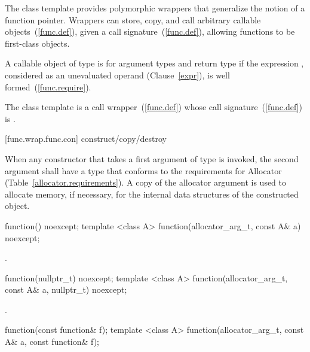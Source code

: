 \pnum
The  class template provides polymorphic wrappers that
generalize the notion of a function pointer. Wrappers can store, copy,
and call arbitrary callable objects~(\ref{func.def}), given a call
signature~(\ref{func.def}), allowing functions to be first-class objects.

\pnum
{}%
A callable object  of type 
is  for argument
types 
and return type 
if the expression
,
considered as an unevaluated operand (Clause~\ref{expr}), is
well formed~(\ref{func.require}).

\pnum
The  class template is a call
wrapper~(\ref{func.def}) whose call signature~(\ref{func.def})
is .

[func.wrap.func.con]{ construct/copy/destroy}

\pnum
When any  constructor that takes a first argument of type
 is invoked, the second argument shall have a type that conforms
to the requirements for Allocator (Table~\ref{allocator.requirements}). A copy of the
allocator argument is used to allocate memory, if necessary, for the internal data
structures of the constructed  object.

\begin{itemdecl}
function() noexcept;
template <class A> function(allocator_arg_t, const A& a) noexcept;
\end{itemdecl}

\begin{itemdescr}
\pnum\postcondition {}.
\end{itemdescr}

\begin{itemdecl}
function(nullptr_t) noexcept;
template <class A> function(allocator_arg_t, const A& a, nullptr_t) noexcept;
\end{itemdecl}

\begin{itemdescr}
\pnum
\postcondition {}.
\end{itemdescr}

\begin{itemdecl}
function(const function& f);
template <class A> function(allocator_arg_t, const A& a, const function& f);
\end{itemdecl}

